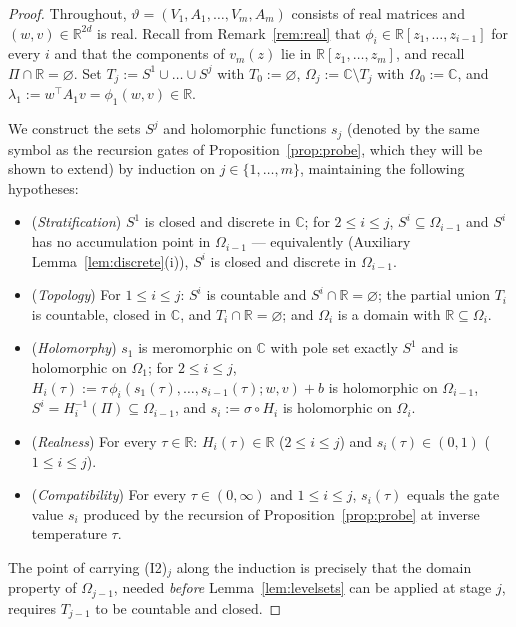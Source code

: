 \documentclass[11pt]{article}
\theoremstyle{definition}
\theoremstyle{remark}
\theoremstyle{plain}
\newcommand{\R}{\mathbb{R}}
\newcommand{\C}{\mathbb{C}}
\newcommand{\sig}{\sigma}
\begin{document}
\begin{proof}
Throughout, $\vartheta=(V_1,A_1,\dots,V_m,A_m)$ consists of real matrices and
$(w,v)\in\R^{2d}$ is real.  Recall from Remark~\ref{rem:real} that
$\phi_i\in\R[z_1,\dots,z_{i-1}]$ for every $i$ and that the components of $v_m(z)$ lie in
$\R[z_1,\dots,z_m]$, and recall $\Pi\cap\R=\varnothing$.  Set
$T_j:=S^1\cup\dots\cup S^j$ with $T_0:=\varnothing$, $\Omega_j:=\C\setminus T_j$ with
$\Omega_0:=\C$, and $\lambda_1:=w^\top A_1v=\phi_1(w,v)\in\R$.

We construct the sets $S^j$ and holomorphic functions $s_j$ (denoted by the same symbol
as the recursion gates of Proposition~\ref{prop:probe}, which they will be shown to
extend) by induction on $j\in\{1,\dots,m\}$, maintaining the following hypotheses:
\begin{itemize}
\item[(I1)$_j$] (\emph{Stratification})  $S^1$ is closed and discrete in $\C$; for
$2\le i\le j$, $S^i\subseteq\Omega_{i-1}$ and $S^i$ has no accumulation point in
$\Omega_{i-1}$ --- equivalently (Auxiliary Lemma~\ref{lem:discrete}(i)), $S^i$ is closed
and discrete in $\Omega_{i-1}$.
\item[(I2)$_j$] (\emph{Topology})  For $1\le i\le j$: $S^i$ is countable and
$S^i\cap\R=\varnothing$; the partial union $T_i$ is countable, closed in $\C$, and
$T_i\cap\R=\varnothing$; and $\Omega_i$ is a domain with $\R\subseteq\Omega_i$.
\item[(I3)$_j$] (\emph{Holomorphy})  $s_1$ is meromorphic on $\C$ with pole set exactly
$S^1$ and is holomorphic on $\Omega_1$; for $2\le i\le j$,
$H_i(\tau):=\tau\,\phi_i(s_1(\tau),\dots,s_{i-1}(\tau);w,v)+b$ is holomorphic on
$\Omega_{i-1}$, $S^i=H_i^{-1}(\Pi)\subseteq\Omega_{i-1}$, and $s_i:=\sig\circ H_i$ is
holomorphic on $\Omega_i$.
\item[(I4)$_j$] (\emph{Realness})  For every $\tau\in\R$: $H_i(\tau)\in\R$ ($2\le i\le j$)
and $s_i(\tau)\in(0,1)$ ($1\le i\le j$).
\item[(I5)$_j$] (\emph{Compatibility})  For every $\tau\in(0,\infty)$ and $1\le i\le j$,
$s_i(\tau)$ equals the gate value $s_i$ produced by the recursion of
Proposition~\ref{prop:probe} at inverse temperature $\tau$.
\end{itemize}
The point of carrying (I2)$_j$ along the induction is precisely that the domain property
of $\Omega_{j-1}$, needed \emph{before} Lemma~\ref{lem:levelsets} can be applied at stage
$j$, requires $T_{j-1}$ to be countable and closed.


\end{proof}
\end{document}
